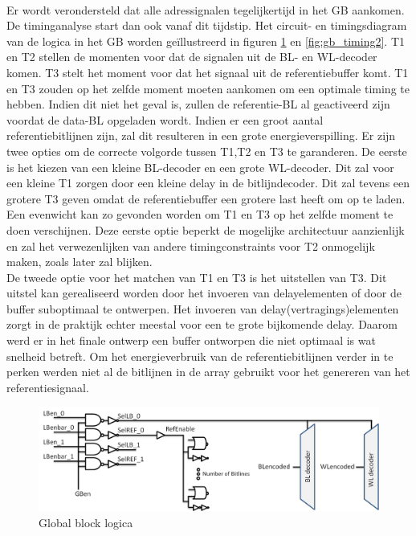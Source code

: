\paragraph{}
Er wordt verondersteld dat alle adressignalen tegelijkertijd in het GB aankomen. De timinganalyse start dan ook vanaf dit tijdstip. Het circuit- en timingsdiagram van de logica in het GB worden geïllustreerd in figuren \ref{fig:gb_timing1} en \ref{fig:gb_timing2}. T1 en T2 stellen de momenten voor dat de signalen uit de BL- en WL-decoder komen. T3 stelt het moment voor dat het signaal uit de referentiebuffer komt. T1 en T3 zouden op het zelfde moment moeten aankomen om een optimale timing te hebben. Indien dit niet het geval is, zullen de referentie-BL al geactiveerd zijn voordat de data-BL opgeladen wordt. Indien er een groot aantal referentiebitlijnen zijn, zal dit resulteren in een grote energieverspilling. Er zijn twee opties om de correcte volgorde tussen T1,T2 en T3 te garanderen. De eerste is het kiezen van een kleine BL-decoder en een grote WL-decoder. Dit zal voor een kleine T1 zorgen door een kleine delay in de bitlijndecoder. Dit zal tevens een grotere T3 geven omdat de referentiebuffer een grotere last heeft om op te laden. Een evenwicht kan zo gevonden worden om T1 en T3 op het zelfde moment te doen verschijnen. Deze eerste optie beperkt de mogelijke architectuur aanzienlijk en zal het verwezenlijken van andere timingconstraints voor T2 onmogelijk maken, zoals later zal blijken.\\ 
De tweede optie voor het matchen van T1 en T3 is het uitstellen van T3. Dit uitstel kan gerealiseerd worden door het invoeren van delayelementen of door de buffer suboptimaal te ontwerpen. Het invoeren van delay(vertragings)elementen zorgt in de praktijk echter meestal voor een te grote bijkomende delay. Daarom werd er in het finale ontwerp een buffer ontworpen die niet optimaal is wat snelheid betreft. Om het energieverbruik van de referentiebitlijnen verder in te perken werden niet al de bitlijnen in de array gebruikt voor het genereren van het referentiesignaal.

\begin{figure}[!ht]
  \centering
  \includegraphics[scale=0.6]{../fig/hfdstk-timing-gb1.png}
  \caption[Global block:logica]{Global block logica}
  \label{fig:gb_timing1}
\end{figure}

